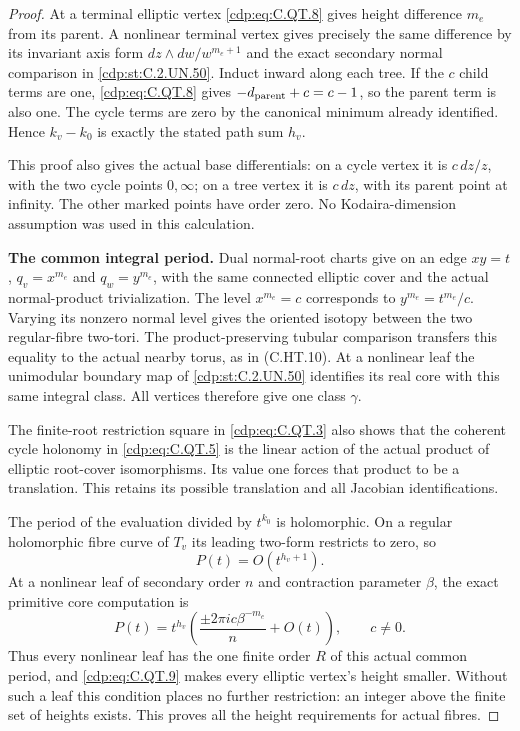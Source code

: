 \begin{proof}
At a terminal elliptic vertex \eqref{cdp:eq:C.QT.8} gives
height difference $m_e$ from its parent. A
nonlinear terminal vertex gives precisely the
same difference by its invariant axis form
$dz\wedge dw/w^{m_e+1}$ and the exact secondary
normal comparison in \ref{cdp:st:C.2.UN.50}. Induct inward along
each tree. If the $c$ child terms are one,
\eqref{cdp:eq:C.QT.8} gives $-d_{\rm parent}+c=c-1$,
so the parent term is also one. The cycle
terms are zero by the canonical minimum
already identified. Hence $k_v-k_0$ is exactly
the stated path sum $h_v$.

This proof also gives the actual base differentials:
on a cycle vertex it is $c\,dz/z$, with the two
cycle points $0,\infty$; on a tree vertex it is
$c\,dz$, with its parent point at infinity.
The other marked points have order zero.
No Kodaira-dimension assumption was used in
this calculation.

\par\medskip\noindent\textbf{The common integral period.}
Dual normal-root charts give on an edge
$xy=t$, $q_v=x^{m_e}$ and $q_w=y^{m_e}$,
with the same connected elliptic cover and
the actual normal-product trivialization.
The level $x^{m_e}=c$ corresponds to
$y^{m_e}=t^{m_e}/c$. Varying its nonzero
normal level gives the oriented isotopy
between the two regular-fibre two-tori.
The product-preserving tubular comparison
transfers this equality to the actual
nearby torus, as in (C.HT.10).
At a nonlinear leaf the unimodular boundary
map of \ref{cdp:st:C.2.UN.50} identifies its real core with
this same integral class. All vertices
therefore give one class $\gamma$.

The finite-root restriction square in
\eqref{cdp:eq:C.QT.3} also shows that the coherent
cycle holonomy in \eqref{cdp:eq:C.QT.5} is the linear
action of the actual product of elliptic
root-cover isomorphisms. Its value one
forces that product to be a translation.
This retains its possible translation
and all Jacobian identifications.

The period of the evaluation divided by
$t^{k_0}$ is holomorphic. On a regular
holomorphic fibre curve of $T_v$ its
leading two-form restricts to zero, so
\[
                  P(t)=O(t^{h_v+1}).
\tag{C.QT.9}\label{cdp:eq:C.QT.9}
\]
At a nonlinear leaf of secondary order
$n$ and contraction parameter $\beta$,
the exact primitive core computation is
\[
 P(t)=t^{h_v}
       \left(\frac{\pm2\pi i c\beta^{-m_e}}n+O(t)\right),
                         \qquad c\ne0.
\tag{C.QT.10}\label{cdp:eq:C.QT.10}
\]
Thus every nonlinear leaf has the one
finite order $R$ of this actual common
period, and \eqref{cdp:eq:C.QT.9} makes every elliptic
vertex's height smaller. Without such a
leaf this condition places no further
restriction: an integer above the finite
set of heights exists. This proves all
the height requirements for actual fibres.


\end{proof}

